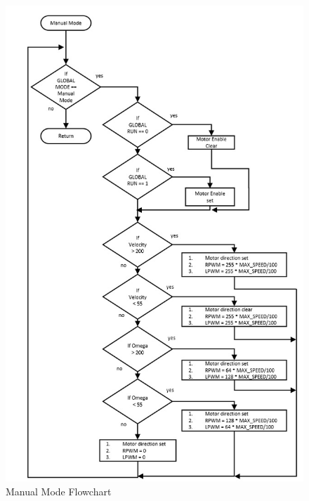 \documentclass{article}
\begin{document}
	\begin{figure}[h]
		\includegraphics[scale=0.8]{Manual_mode_flow.jpg}
		\centering
		\caption{Manual Mode Flowchart}
	\end{figure}
	
	
\end{document}
